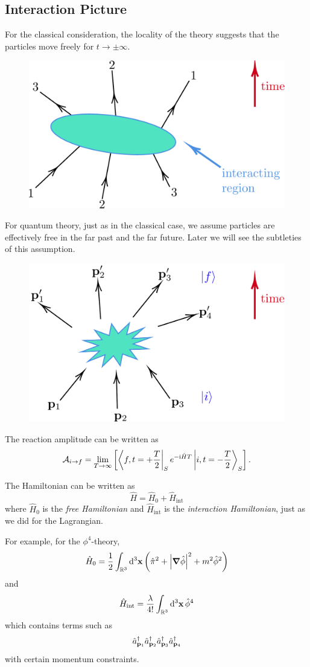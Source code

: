 \documentclass[a4paper,11pt]{article}
\begin{document}
	\subsection{Interaction Picture}

	For the classical consideration, the locality of the theory suggests that the particles move freely for $t \to \pm \infty$.

	\begin{figure}[H]
		\centering
		\includegraphics[width=0.5\linewidth]{fig/classical-scattering.pdf}
	\end{figure}

	For quantum theory, just as in the classical case, we assume particles are effectively free in the far past and the far future. Later we will see the subtleties of this assumption.

	\begin{figure}[H]
		\centering
		\includegraphics[width=0.5\linewidth]{fig/quantum-scattering.pdf}
	\end{figure}

	The reaction amplitude can be written as
	\[
		\mathcal{A}_{i \to f} = \lim _{T \to \infty} \left[ \bra{f, t = +\frac{T}{2}}_S{e ^{-\mathrm{i} \hat H T}}\ket{i, t = -\frac{T}{2}}_S \right].
	\]

	The Hamiltonian can be written as 
	\[
		\hat H = \hat H_0 + \hat H _{\text{int}}
	\]
	where $\hat H_0$ is the \emph{free Hamiltonian} and $\hat H _{\text{int}}$ is the \emph{interaction Hamiltonian}, just as we did for the Lagrangian.

	For example, for the $\phi^4$-theory,
	\[
		\hat H_0 = \frac{1}{2} \int _{\mathbb{R}^3} \dd[3]{\vb x} \left( \hat \pi^2 + \abs{\grad \hat \phi}^2 + m^2 \hat \phi^2 \right)
	\]
	and
	\[
		\hat H _{\text{int}} = \frac{\lambda}{4!} \int _{\mathbb{R}^3} \dd[3]{\vb x} \hat \phi^4
	\]
	which contains terms such as 
	\[
		\hat a^{\dagger} _{\vb p_1}\hat a^{\dagger} _{\vb p_2} \hat a^{\dagger} _{\vb p_3} \hat a^{\dagger} _{\vb p_4}
	\]
	with certain momentum constraints.
\end{document}

